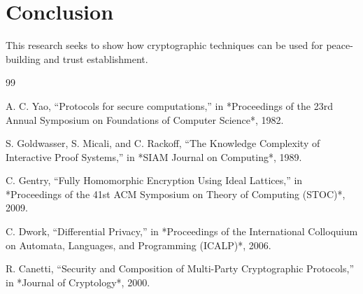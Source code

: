 \documentclass[conference]{IEEEtran}
\begin{document}
\section{Conclusion}
This research seeks to show how cryptographic techniques can be used for peace-building and trust establishment. 

\begin{thebibliography}{99}

A. C. Yao, ``Protocols for secure computations,'' in *Proceedings of the 23rd Annual Symposium on Foundations of Computer Science*, 1982.

S. Goldwasser, S. Micali, and C. Rackoff, ``The Knowledge Complexity of Interactive Proof Systems,'' in *SIAM Journal on Computing*, 1989.

C. Gentry, ``Fully Homomorphic Encryption Using Ideal Lattices,'' in *Proceedings of the 41st ACM Symposium on Theory of Computing (STOC)*, 2009.

C. Dwork, ``Differential Privacy,'' in *Proceedings of the International Colloquium on Automata, Languages, and Programming (ICALP)*, 2006.

R. Canetti, ``Security and Composition of Multi-Party Cryptographic Protocols,'' in *Journal of Cryptology*, 2000.

\end{thebibliography}



\end{document}
